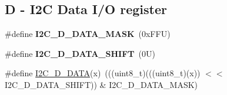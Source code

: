 \subsection*{D -\/ I2C Data I/O register}
\begin{DoxyCompactItemize}
\item 
\mbox{\label{group___i2_c___register___masks_gaeb11bc3736eba5b805bdc4bced7edb2e}} 
\#define {\bfseries I2\+C\+\_\+\+D\+\_\+\+D\+A\+T\+A\+\_\+\+M\+A\+SK}~(0x\+F\+F\+U)
\item 
\mbox{\label{group___i2_c___register___masks_gac9b220edf37227949c367bf455d11a04}} 
\#define {\bfseries I2\+C\+\_\+\+D\+\_\+\+D\+A\+T\+A\+\_\+\+S\+H\+I\+FT}~(0\+U)
\item 
\#define \mbox{\hyperlink{group___i2_c___register___masks_ga7b68b1d5f1aa40f4bc5e9310e0a63754}{I2\+C\+\_\+\+D\+\_\+\+D\+A\+TA}}(x)~(((uint8\+\_\+t)(((uint8\+\_\+t)(x)) $<$$<$ I2\+C\+\_\+\+D\+\_\+\+D\+A\+T\+A\+\_\+\+S\+H\+I\+FT)) \& I2\+C\+\_\+\+D\+\_\+\+D\+A\+T\+A\+\_\+\+M\+A\+SK)
\end{DoxyCompactItemize}
